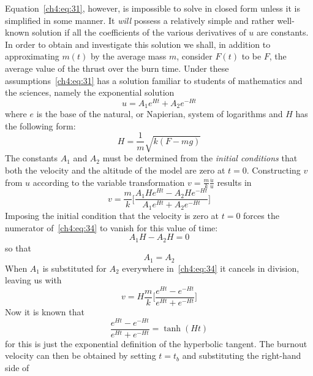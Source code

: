 Equation~\eqref{ch4:eq:31}, however, is impossible to solve in closed form unless it is simplified
in some manner. It \emph{will} possess a relatively simple and rather well-known solution if all
the coefficients of the various derivatives of $u$ are constants. In order to obtain and
investigate this solution we shall, in addition to approximating $m(t)$ by the average mass $m$,
consider $F(t)$ to be $F$, the average value of the thrust over the burn time. Under these
assumptions~\eqref{ch4:eq:31} has a solution familiar to students of mathematics and the sciences,
namely the exponential solution
\begin{equation}\label{ch4:eq:32}
u = A_1e^{Ht} + A_2e^{-Ht}
\end{equation}
where $e$ is the base of the natural, or Napierian, system of logarithms and $H$ has the following
form:
\begin{equation}\label{ch4:eq:33}
H = \frac{1}{m}\sqrt{k(F - mg)}
\end{equation}
The constants $A_1$ and $A_2$ must be determined from the \emph{initial conditions} that both the
velocity and the altitude of the model are zero at $t = 0$. Constructing $v$ from $u$ according to
the variable transformation $v = \frac{m}{k}\frac{\dot{u}}{u}$ results in
\begin{equation}\label{ch4:eq:34}
v = \frac{m}{k}\biggl[\frac{A_1He^{Ht} - A_2He^{-Ht}}{A_1e^{Ht} + A_2e^{-Ht}}\biggr]
\end{equation}
Imposing the initial condition that the velocity is zero at $t = 0$ forces the numerator
of~\eqref{ch4:eq:34} to vanish for this value of time:
\begin{equation*}
A_1H - A_2H = 0
\end{equation*}
so that
\begin{equation}\label{ch4:eq:35}
A_1 = A_2
\end{equation}
When $A_1$ is substituted for $A_2$ everywhere in~\eqref{ch4:eq:34} it cancels in division, leaving
us with
\begin{equation}\label{ch4:eq:36}
v = H\frac{m}{k}\biggl[\frac{e^{Ht} - e^{-Ht}}{e^{Ht} + e^{-Ht}}\biggr]
\end{equation}
Now it is known that
\begin{equation}\label{ch4:eq:37}
\frac{e^{Ht} - e^{-Ht}}{e^{Ht} + e^{-Ht}} = \tanh(Ht)
\end{equation}
for this is just the exponential definition of the hyperbolic tangent. The burnout velocity can
then be obtained by setting $t = t_b$ and substituting the right-hand side of
